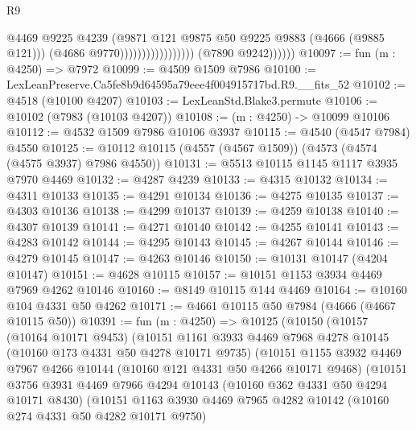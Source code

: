 \begin{lexlean}{R9}
\begin{coremodule}
                                              @4469
                                              @9225
                                              @4239
                                              (@9871
                                                @121
                                                @9875
                                                @50
                                                @9225
                                                @9883
                                                (@4666 (@9885 @121)))
                                              (@4686 @9770)))))))))))))))))
              (@7890 @9242))))))
@10097 := fun (m : @4250) => @7972
@10099 := @4509 @1509 @7986
@10100 := LexLeanPreserve.Ca5fe8b9d64595a79eee4f004915717bd.R9.__fits_52
@10102 := @4518 (@10100 @4207)
@10103 := LexLeanStd.Blake3.permute
@10106 := @10102 (@7983 (@10103 @4207))
@10108 := (m : @4250) -> @10099 @10106
@10112 := @4532 @1509 @7986 @10106 @3937
@10115 := @4540 (@4547 @7984) @4550
@10125 := @10112 @10115 (@4557 (@4567 @1509)) (@4573 (@4574 (@4575 @3937) @7986 @4550))
@10131 := @5513 @10115 @1145 @1117 @3935 @7970 @4469
@10132 := @4287 @4239
@10133 := @4315 @10132
@10134 := @4311 @10133
@10135 := @4291 @10134
@10136 := @4275 @10135
@10137 := @4303 @10136
@10138 := @4299 @10137
@10139 := @4259 @10138
@10140 := @4307 @10139
@10141 := @4271 @10140
@10142 := @4255 @10141
@10143 := @4283 @10142
@10144 := @4295 @10143
@10145 := @4267 @10144
@10146 := @4279 @10145
@10147 := @4263 @10146
@10150 := @10131 @10147 (@4204 @10147)
@10151 := @4628 @10115
@10157 := @10151 @1153 @3934 @4469 @7969 @4262 @10146
@10160 := @8149 @10115 @144 @4469
@10164 := @10160 @104 @4331 @50 @4262
@10171 := @4661 @10115 @50 @7984 (@4666 (@4667 @10115 @50))
@10391 := fun (m : @4250) =>
  @10125
    (@10150
      (@10157
        (@10164 @10171 @9453)
        (@10151
          @1161
          @3933
          @4469
          @7968
          @4278
          @10145
          (@10160 @173 @4331 @50 @4278 @10171 @9735)
          (@10151
            @1155
            @3932
            @4469
            @7967
            @4266
            @10144
            (@10160 @121 @4331 @50 @4266 @10171 @9468)
            (@10151
              @3756
              @3931
              @4469
              @7966
              @4294
              @10143
              (@10160 @362 @4331 @50 @4294 @10171 @8430)
              (@10151
                @1163
                @3930
                @4469
                @7965
                @4282
                @10142
                (@10160 @274 @4331 @50 @4282 @10171 @9750)

\end{coremodule}
\end{lexlean}
